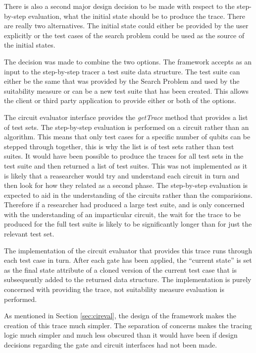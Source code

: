 There is also a second major design decision to be made with respect to the step-by-step evaluation, what the initial state should be to produce the trace.
There are really two alternatives.
The initial state could either be provided by the user explicitly or the test cases of the search problem could be used as the source of the initial  states.

The decision was made to combine the two options.
The framework accepts as an input to the step-by-step tracer a test suite data structure.
The test suite can either be the same that was provided by the Search Problem and used by the suitability measure or can be a new test suite that has been created.
This allows the client or third party application to provide either or both of the options.

The circuit evaluator interface provides the \emph{getTrace} method that provides a list of test sets.
The step-by-step evaluation is performed on a circuit rather than an algorithm.
This means that only test cases for a specific number of qubits can be stepped through together, this is why the list is of test sets rather than test suites.
It would have been possible to produce the traces for all test sets in the test suite and then returned a list of test suites.
This was not implemented as it is likely that a reasearcher would try and understand each circuit in turn and then look for how they related as a second phase.
The step-by-step evaluation is expected to aid in the understanding of the circuits rather than the comparisions.
Therefore if a researcher had produced a large test suite, and is only concerned with the understanding of an imparticular circuit, the wait for the trace to be produced for the full test suite is likely to be significantly longer than for just the relevant test set.

The implementation of the circuit evaluator that provides this trace runs through each test case in turn.
After each gate has been applied, the ``current state'' is set as the final state attribute of a cloned version of the current test case that is subsequently added to the returned data structure.
The implementation is purely concerned with providing the trace, not suitability measure evaluation is performed.

As mentioned in Section \ref{sec:cireval}, the design of the framework makes the creation of this trace much simpler.
The separation of concerns makes the tracing logic much simpler and much less obscured than it would have been if design decisions regarding the gate and circuit interfaces had not been made.

